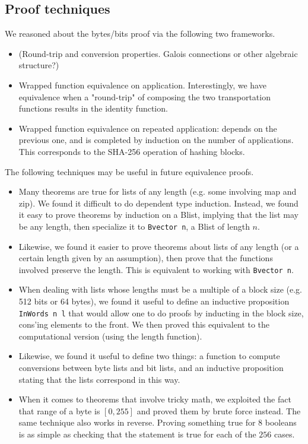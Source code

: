 \documentclass[twocolumn,showpacs,%
  nofootinbib,aps,superscriptaddress,%
  eqsecnum,prd,notitlepage,showkeys,10pt]{revtex4-1}
\begin{document}
\subsection{Proof techniques}

We reasoned about the bytes/bits proof via the following two frameworks.

\begin{itemize}
\item (Round-trip and conversion properties. Galois connections or other algebraic structure?)
\item Wrapped function equivalence on application. Interestingly, we have equivalence when a "round-trip" of composing the two transportation functions results in the identity function.
\item Wrapped function equivalence on repeated application: depends on the previous one, and is completed by induction on the number of applications. This corresponds to the SHA-256 operation of hashing blocks.
\end{itemize}

The following techniques may be useful in future equivalence proofs.

\begin{itemize}
\item Many theorems are true for lists of any length (e.g. some involving map and zip). We found it difficult to do dependent type induction. Instead, we found it easy to prove theorems by induction on a Blist, implying that the list may be any length, then specialize it to \verb|Bvector n|, a Blist of length $n$. 
\item Likewise, we found it easier to prove theorems about lists of any length (or a certain length given by an assumption), then prove that the functions involved preserve the length. This is equivalent to working with \verb|Bvector n|.
\item When dealing with lists whose lengths must be a multiple of a block size (e.g. 512 bits or 64 bytes), we found it useful to define an inductive proposition \verb|InWords n l| that would allow one to do proofs by inducting in the block size, cons'ing elements to the front. We then proved this equivalent to the computational version (using the length function).
\item Likewise, we found it useful to define two things: a function to compute conversions between byte lists and bit lists, and an inductive proposition stating that the lists correspond in this way.
\item When it comes to theorems that involve tricky math, we exploited the fact that range of a byte is $[0, 255]$ and proved them by brute force instead. The same technique also works in reverse. Proving something true for $8$ booleans is as simple as checking that the statement is true for each of the $256$ cases.
\end{itemize}
\end{document}
